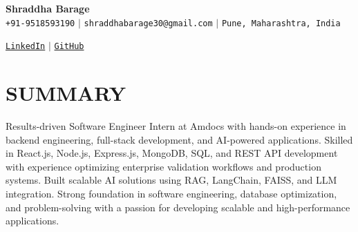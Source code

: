 \documentclass[letterpaper,10pt]{article}
\begin{document}
\begin{center}
    \textbf{\LARGE Shraddha Barage} \\ \vspace{3pt}
    \small \faPhone* \texttt{\hspace{1pt}+91-9518593190} \hspace{1pt} $|$
    \hspace{1pt} \faEnvelope \hspace{2pt} \texttt{shraddhabarage30@gmail.com} \hspace{1pt} $|$
    \hspace{1pt} \faMapMarker* \hspace{2pt}\texttt{Pune, Maharashtra, India} \\ \vspace{3pt}
    
    \faLinkedin \hspace{1pt} \href{https://www.linkedin.com/in/shraddha-barage}{\texttt{LinkedIn}} \hspace{1pt} $|$
    \hspace{1pt} \faGithub \hspace{1pt} \href{https://github.com/shraddha-barage}{\texttt{GitHub}}
    \\ \vspace{-8pt}
\end{center}

\section{SUMMARY}
\small{
Results-driven Software Engineer Intern at Amdocs with hands-on experience in backend engineering, full-stack development, and AI-powered applications. Skilled in React.js, Node.js, Express.js, MongoDB, SQL, and REST API development with experience optimizing enterprise validation workflows and production systems. Built scalable AI solutions using RAG, LangChain, FAISS, and LLM integration. Strong foundation in software engineering, database optimization, and problem-solving with a passion for developing scalable and high-performance applications.
{\vspace{-1pt}}
}


\end{document}
